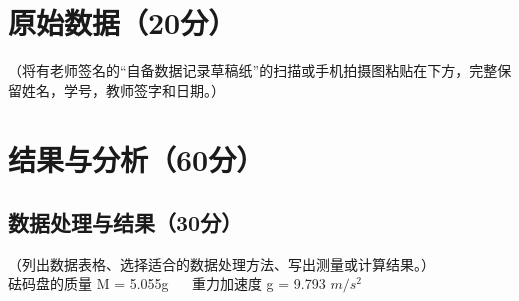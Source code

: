 \documentclass[]{../template/Report}%
\begin{document}
\begin{fullreportonly}
\section{原始数据（20分）}
（将有老师签名的“自备数据记录草稿纸”的扫描或手机拍摄图粘贴在下方，完整保留姓名，学号，教师签字和日期。）

\section{结果与分析（60分）}
\subsection{数据处理与结果（30分）}
（列出数据表格、选择适合的数据处理方法、写出测量或计算结果。） \\
砝码盘的质量 M = 5.055g $\quad$ 重力加速度 g = 9.793 $m/s^2$

\end{fullreportonly}
\end{document}
